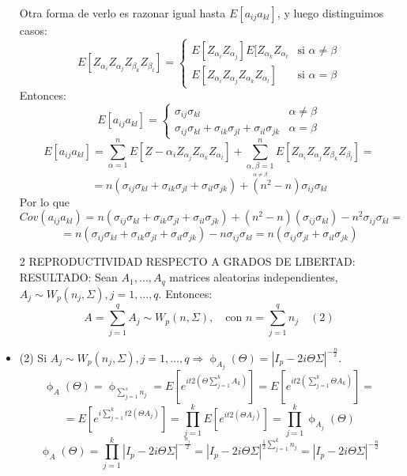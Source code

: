 \documentclass[11pt,a4paper]{article}
\begin{document}
\begin{itemize}
Otra forma de verlo es razonar igual hasta $E[a_{ij}a_{kl}]$, y luego distinguimos casos:
$$E[Z_{\alpha_{i}} Z_{\alpha_{j}} Z_{\beta_{k}} Z_{\beta_{l}}] = \begin{cases}
E[Z_{\alpha_{i}}Z_{\alpha_{j}}] E[Z_{\alpha_{k}} Z_{\alpha_{l}} & \text{si } \alpha \neq \beta \\
E[Z_{\alpha_{i}} Z_{\alpha_{j}} Z_{\alpha_{k}} Z_{\alpha_{l}}] & \text{si } \alpha = \beta
\end{cases}$$
Entonces:
$$E[a_{ij}a_{kl}] = \begin{cases}
\sigma_{ij}\sigma_{kl} & \alpha \neq \beta \\
\sigma_{ij}\sigma_{kl} + \sigma_{ik}\sigma_{jl} + \sigma_{il}\sigma_{jk} & \alpha = \beta 
\end{cases}$$
$$E[a_{ij}a_{kl}] = \sum_{\alpha=1}^{n} E[Z-{\alpha_{i}} Z_{\alpha_{j}} Z_{\alpha_{k}} Z_{\alpha_{l}}] + \sum_{\underset{\alpha \neq \beta}{\alpha, \beta = 1}}^{n} E[Z_{\alpha_{i}} Z_{\alpha_{j}} Z_{\beta_{k}} Z_{\beta_{l}}] =$$
$$= n(\sigma_{ij}\sigma_{kl} + \sigma_{ik}\sigma_{jl} + \sigma_{il}\sigma_{jk}) + (n^{2}-n)\sigma_{ij}\sigma_{kl}$$
Por lo que
$$Cov(a_{ij}a_{kl}) = n(\sigma_{ij}\sigma_{kl} + \sigma_{ik}\sigma_{jl} + \sigma_{il}\sigma_{jk}) + (n^{2}-n)(\sigma_{ij}\sigma_{kl}) - n^{2}\sigma_{ij}\sigma_{kl} =$$
$$= n(\sigma_{ij}\sigma_{kl} + \sigma_{ik}\sigma_{jl} + \sigma_{il}\sigma_{jk}) - n\sigma_{ij}\sigma_{kl} = n(\sigma_{ij}\sigma_{jl} + \sigma_{il}\sigma_{jk})$$

\item[2] REPRODUCTIVIDAD RESPECTO A GRADOS DE LIBERTAD: \\
RESULTADO: Sean $A_{1}, \dots, A_{q}$ matrices aleatorias independientes, $A_{j} \sim W_{p}(n_{j}, \Sigma), j = 1, \dots, q$. Entonces:
$$A = \sum_{j=1}^{q} A_{j} \sim W_{p}(n, \Sigma), \quad \text{con } n = \sum_{j=1}^{q}n_{j} \quad (2)$$

\item (2) Si $A_{j} \sim W_{p}(n_{j}, \Sigma), j = 1, \dots, q \Rightarrow \upphi_{A_{j}}(\Theta) = |I_{p} - 2i\Theta\Sigma|^{-\frac{n}{2}}$.
$$\upphi_{A}(\Theta) = \upphi_{\sum_{j=1}^{s}n_{j}} = E[e^{it2(\Theta\sum_{j=1}^{k}A_{k})}] = E[e^{it2(\sum_{j=1}^{k}\Theta A_{k})}] =$$ 
$$= E[e^{i\sum_{j=1}^{k}t2(\Theta A_{j})}] = \prod_{j=1}^{k} E[e^{it2(\Theta A_{j})}] = \prod_{j=1}^{k} \upphi_{A_{j}}(\Theta)$$
$$\upphi_{A}(\Theta) = \prod_{j=1}^{k} |I_{p} - 2i\Theta\Sigma|^{-\frac{n_{j}}{2}} = |I_{p} - 2i\Theta\Sigma|^{\frac{1}{2} \sum_{j=1}^{k}n_{j}} = |I_{p} - 2i\Theta\Sigma|^{-\frac{n}{2}}$$


\end{itemize}
\end{document}
